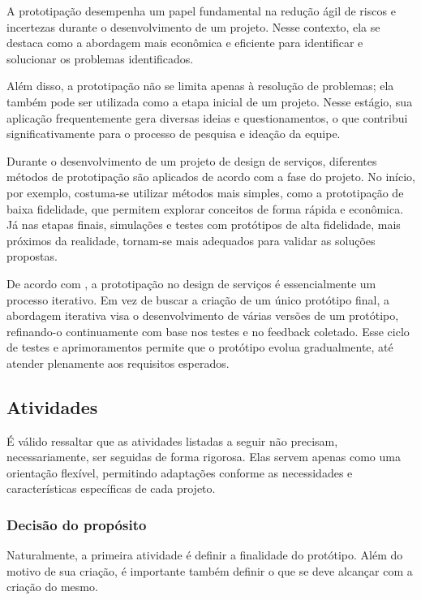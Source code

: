 A prototipação desempenha um papel fundamental na redução ágil de riscos e incertezas durante o desenvolvimento de um projeto. Nesse contexto, ela se destaca como a abordagem mais econômica e eficiente para identificar e solucionar os problemas identificados.

Além disso, a prototipação não se limita apenas à resolução de problemas; ela também pode ser utilizada como a etapa inicial de um projeto. Nesse estágio, sua aplicação frequentemente gera diversas ideias e questionamentos, o que contribui significativamente para o processo de pesquisa e ideação da equipe.

Durante o desenvolvimento de um projeto de design de serviços, diferentes métodos de prototipação são aplicados de acordo com a fase do projeto. No início, por exemplo, costuma-se utilizar métodos mais simples, como a prototipação de baixa fidelidade, que permitem explorar conceitos de forma rápida e econômica. Já nas etapas finais, simulações e testes com protótipos de alta fidelidade, mais próximos da realidade, tornam-se mais adequados para validar as soluções propostas.

De acordo com \cite{Christie2012}, a prototipação no design de serviços é essencialmente um processo iterativo. Em vez de buscar a criação de um único protótipo final, a abordagem iterativa visa o desenvolvimento de várias versões de um protótipo, refinando-o continuamente com base nos testes e no feedback coletado. Esse ciclo de testes e aprimoramentos permite que o protótipo evolua gradualmente, até atender plenamente aos requisitos esperados.

\subsection{Atividades}

É válido ressaltar que as atividades listadas a seguir não precisam, necessariamente, ser seguidas de forma rigorosa. Elas servem apenas como uma orientação flexível, permitindo adaptações conforme as necessidades e características específicas de cada projeto.

\subsubsection{Decisão do propósito}

Naturalmente, a primeira atividade é definir a finalidade do protótipo. Além do motivo de sua criação, é importante também definir o que se deve alcançar com a criação do mesmo.

